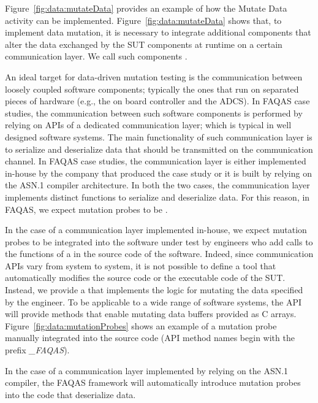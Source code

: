 Figure~\ref{fig:data:mutateData} provides an example of how the Mutate Data activity can be implemented. Figure~\ref{fig:data:mutateData} shows that, to implement data mutation, it is necessary to integrate additional components that alter the data exchanged by the SUT components at runtime on a certain communication layer. We call such components .

An ideal target for data-driven mutation testing is the communication between loosely coupled software components; typically the ones that run on separated pieces of hardware (e.g., the on board controller and the ADCS).
In FAQAS case studies, the communication between such software components is performed by relying on APIs of a dedicated communication layer; which is typical in well designed software systems. The main functionality of such communication layer is to serialize and deserialize data that should be transmitted on the communication channel. In FAQAS case studies, the communication layer is either implemented in-house by the company that produced the case study or it is built by relying on the ASN.1 compiler architecture. In both the two cases, the communication layer implements distinct functions to serialize and deserialize data.
For this reason, in FAQAS, we expect mutation probes to be .

In the case of a communication layer implemented in-house, we expect mutation probes to be integrated into the software under test by engineers who  add calls to the functions of a  in the source code of the software. Indeed, since communication APIs vary from system to system, it is not possible to define a tool that automatically modifies the source code or the executable code of the SUT.  Instead, we provide a  that implements the logic for mutating the data specified by the engineer.
To be applicable to a wide range of software systems, the API will provide methods that enable mutating data buffers provided as C arrays.
Figure~\ref{fig:data:mutationProbes} shows an example of a mutation probe manually integrated into the source code (API method names begin with the prefix \emph{\_FAQAS}).

In the case of a communication layer implemented by relying on the ASN.1 compiler, the FAQAS framework will automatically introduce mutation probes into the code that deserialize data.





